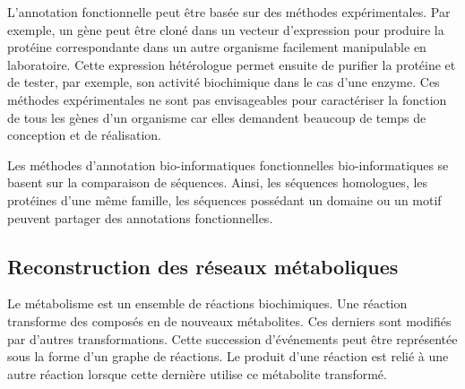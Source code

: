 \begin{refsegment}
    L’annotation fonctionnelle peut être basée sur des méthodes expérimentales. Par exemple, un gène peut être cloné dans un vecteur d’expression pour produire la protéine correspondante dans un autre organisme facilement manipulable en laboratoire. Cette expression hétérologue permet ensuite de purifier la protéine et de tester, par exemple, son activité biochimique dans le cas d’une enzyme. Ces méthodes expérimentales ne sont  pas envisageables pour caractériser la fonction de tous les gènes  d’un organisme car elles demandent beaucoup de temps de conception et de réalisation.
    
    Les méthodes d’annotation bio-informatiques fonctionnelles  bio-informatiques se basent sur la comparaison de séquences. Ainsi, les séquences homologues, les protéines d'une même famille, les séquences possédant un domaine ou un motif peuvent partager des annotations fonctionnelles.
    
    \subsection{Reconstruction des réseaux métaboliques}
    Le métabolisme est un ensemble de réactions biochimiques. Une réaction transforme des composés en de nouveaux métabolites. Ces derniers sont modifiés par d'autres transformations. Cette succession d'événements peut être représentée sous la forme d’un graphe de réactions. Le produit d’une réaction est relié à une autre réaction lorsque cette dernière utilise ce métabolite transformé.
    

\end{refsegment}
